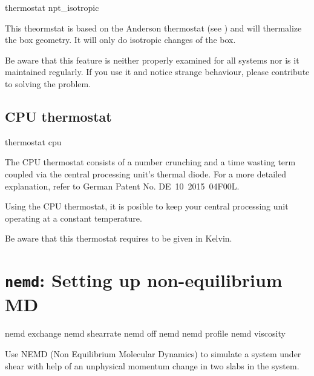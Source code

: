 \begin{essyntax}
  thermostat npt_isotropic   
  \begin{features}
  \end{features}
\end{essyntax}

This theormstat is based on the Anderson thermostat (see
\cite{andersen80a, mann05d}) and will thermalize the box geometry. It
will only do isotropic changes of the box.

Be aware that this feature is neither properly examined for all
systems nor is it maintained regularly. If you use it and notice
strange behaviour, please contribute to solving the problem.
\subsection{CPU thermostat}

\begin{essyntax}
  thermostat cpu 
\end{essyntax}

The CPU thermostat consists of a number crunching and a time wasting
term coupled via the central processing unit's thermal diode. For a
more detailed explanation, refer to German Patent No. DE~10~2015~04F00L.

Using the CPU thermostat, it is posible to keep your central
processing unit operating at a constant temperature.

Be aware that this thermostat requires  to be given
in Kelvin.

\section{\texttt{nemd}: Setting up non-equilibrium MD}
\label{sec:NEMD}

\begin{essyntax}
  nemd exchange  
  nemd shearrate  
  nemd off
  nemd
  nemd profile
  nemd viscosity
  \begin{features}
  \end{features}
\end{essyntax}

Use NEMD (Non Equilibrium Molecular Dynamics) to simulate a system
under shear with help of an unphysical momentum change in two slabs in
the system.

